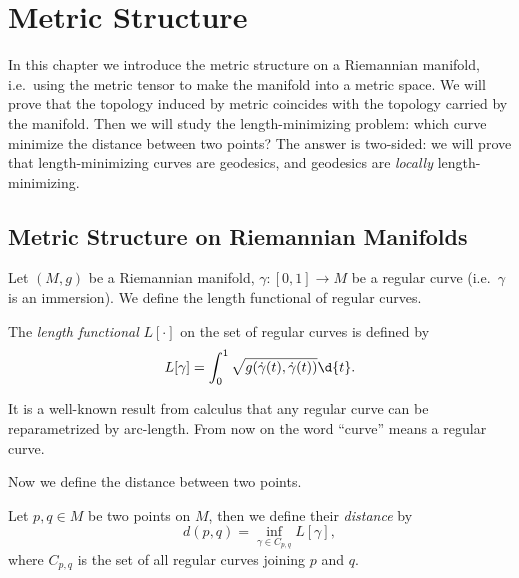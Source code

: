 \chapter{Metric Structure}

In this chapter we introduce the metric structure on a Riemannian manifold, i.e.\ using the metric tensor to make the manifold into a metric space.
We will prove that the topology induced by metric coincides with the topology carried by the manifold.
Then we will study the length-minimizing problem: which curve minimize the distance between two points?
The answer is two-sided: we will prove that length-minimizing curves are geodesics, and geodesics are \emph{locally} length-minimizing.

\section{Metric Structure on Riemannian Manifolds}

Let $(M,g)$ be a Riemannian manifold, $\gamma:[0,1]\to M$ be a regular curve (i.e.\ $\gamma$ is an immersion).
We define the length functional of regular curves.
\begin{defn}
    The \emph{length functional} $L[\cdot]$ on the set of regular curves is defined by
    \[L[\gamma]=\int_0^1\sqrt{g(\dot\gamma(t),\dot\gamma(t))}\d{t}.\]
\end{defn}

It is a well-known result from calculus that any regular curve can be repara\-metrized by arc-length.
From now on the word ``curve'' means a regular curve.

Now we define the distance between two points.
\begin{defn}
    Let $p,q\in M$ be two points on $M$, then we define their \emph{distance} by
    \[d(p,q)=\inf_{\gamma\in C_{p,q}}L[\gamma],\]
    where $C_{p,q}$ is the set of all regular curves joining $p$ and $q$.
\end{defn}

